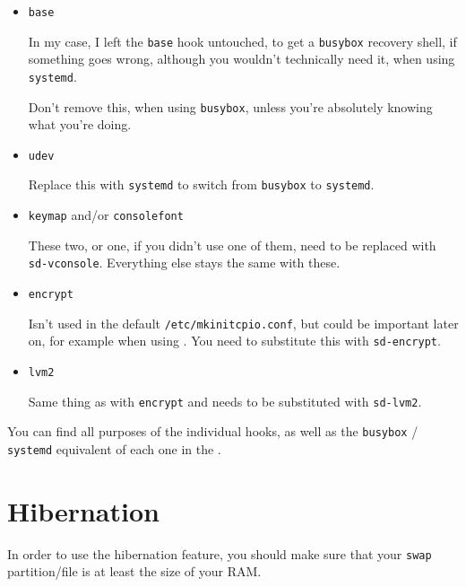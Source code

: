 \documentclass[10pt]{dustdoc}
\begin{document}
\begin{itemize}
    \item \texttt{base}

        In my case, I left the \texttt{base} hook untouched, to get a \texttt{busybox} recovery shell, if something goes wrong, although you wouldn’t technically need it, when using \texttt{systemd}.

        \begin{WARNING}
            Don’t remove this, when using \texttt{busybox}, unless you’re absolutely knowing what you’re doing.
        \end{WARNING}

    \item \texttt{udev}

        Replace this with \texttt{systemd} to switch from \texttt{busybox} to \texttt{systemd}.

    \item \texttt{keymap} and/or \texttt{consolefont}

        These two, or one, if you didn’t use one of them, need to be replaced with \texttt{sd-vconsole}.
        Everything else stays the same with these.

    \item \texttt{encrypt}

        Isn’t used in the default \texttt{/etc/mkinitcpio.conf}, but could be important later on, for example when using .
        You need to substitute this with \texttt{sd-encrypt}.

    \item \texttt{lvm2}

        Same thing as with \texttt{encrypt} and needs to be substituted with \texttt{sd-lvm2}.
\end{itemize}

\begin{NOTE}
    You can find all purposes of the individual hooks, as well as the \texttt{busybox} / \texttt{systemd} equivalent of each one in the .
\end{NOTE}

\section{Hibernation}
\label{sec:hibernation}

In order to use the hibernation feature, you should make sure that your \texttt{swap} partition/file is at least the size of your RAM.
\end{document}
